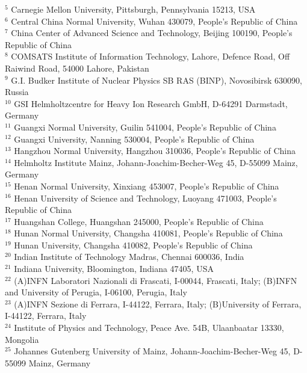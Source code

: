 {\begin{small}
{$^{5}$ Carnegie Mellon University, Pittsburgh, Pennsylvania 15213, USA\\
$^{6}$ Central China Normal University, Wuhan 430079, People's Republic of China\\
$^{7}$ China Center of Advanced Science and Technology, Beijing 100190, People's Republic of China\\
$^{8}$ COMSATS Institute of Information Technology, Lahore, Defence Road, Off Raiwind Road, 54000 Lahore, Pakistan\\
$^{9}$ G.I. Budker Institute of Nuclear Physics SB RAS (BINP), Novosibirsk 630090, Russia\\
$^{10}$ GSI Helmholtzcentre for Heavy Ion Research GmbH, D-64291 Darmstadt, Germany\\
$^{11}$ Guangxi Normal University, Guilin 541004, People's Republic of China\\
$^{12}$ Guangxi University, Nanning 530004, People's Republic of China\\
$^{13}$ Hangzhou Normal University, Hangzhou 310036, People's Republic of China\\
$^{14}$ Helmholtz Institute Mainz, Johann-Joachim-Becher-Weg 45, D-55099 Mainz, Germany\\
$^{15}$ Henan Normal University, Xinxiang 453007, People's Republic of China\\
$^{16}$ Henan University of Science and Technology, Luoyang 471003, People's Republic of China\\
$^{17}$ Huangshan College, Huangshan 245000, People's Republic of China\\
$^{18}$ Hunan Normal University, Changsha 410081, People's Republic of China\\
$^{19}$ Hunan University, Changsha 410082, People's Republic of China\\
$^{20}$ Indian Institute of Technology Madras, Chennai 600036, India\\
$^{21}$ Indiana University, Bloomington, Indiana 47405, USA\\
$^{22}$ (A)INFN Laboratori Nazionali di Frascati, I-00044, Frascati, Italy; (B)INFN and University of Perugia, I-06100, Perugia, Italy\\
$^{23}$ (A)INFN Sezione di Ferrara, I-44122, Ferrara, Italy; (B)University of Ferrara, I-44122, Ferrara, Italy\\
$^{24}$ Institute of Physics and Technology, Peace Ave. 54B, Ulaanbaatar 13330, Mongolia\\
$^{25}$ Johannes Gutenberg University of Mainz, Johann-Joachim-Becher-Weg 45, D-55099 Mainz, Germany\\
}
\end{small}}
